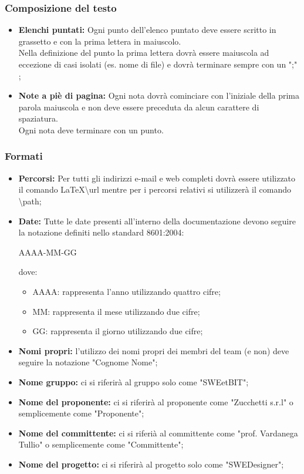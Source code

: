       \subsubsection{Composizione del testo}
        \begin{itemize}
          \item \textbf{Elenchi puntati: }Ogni punto dell'elenco puntato deve essere scritto in grassetto e con la prima lettera in maiuscolo.\\
            Nella definizione del punto la prima lettera dovrà essere maiuscola ad eccezione di casi isolati (es. nome di file) e dovrà terminare sempre con un ";" ;
          \item \textbf{Note a piè di pagina: }Ogni nota dovrà cominciare con l’iniziale della prima parola maiuscola e non deve essere preceduta da alcun carattere di spaziatura.\\
            Ogni nota deve terminare con un punto.
        \end{itemize}
      \subsubsection{Formati}
        \begin{itemize}
          \item \textbf{Percorsi: }Per tutti gli indirizzi e-mail e web completi dovrà essere utilizzato il comando \LaTeX \textbackslash url mentre per i percorsi
            relativi si utilizzerà il comando \textbackslash path;
          \item \textbf{Date: }Tutte le date presenti all'interno della documentazione devono seguire la notazione definiti nello standard  8601:2004:
            \begin{center}
              AAAA-MM-GG\\
            \end{center}
            dove:
            \bgroup
              \begin{itemize}
                \item AAAA: rappresenta l'anno utilizzando quattro cifre;
                \item MM: rappresenta il mese utilizzando due cifre;
                \item GG: rappresenta il giorno utilizzando due cifre;
              \end{itemize}
            \egroup
          \item \textbf{Nomi propri: }l'utilizzo dei nomi propri dei membri del team (e non) deve seguire la notazione "Cognome Nome";
          \item \textbf{Nome gruppo: }ci si riferirà al gruppo solo come "SWEetBIT";
          \item \textbf{Nome del proponente: }ci si riferirà al proponente come "Zucchetti s.r.l" o semplicemente come "Proponente";
          \item \textbf{Nome del committente: }ci si riferià al committente come "prof. Vardanega Tullio" o semplicemente come "Committente";
          \item \textbf{Nome del progetto: }ci si riferirà al progetto solo come "SWEDesigner";
        \end{itemize}
